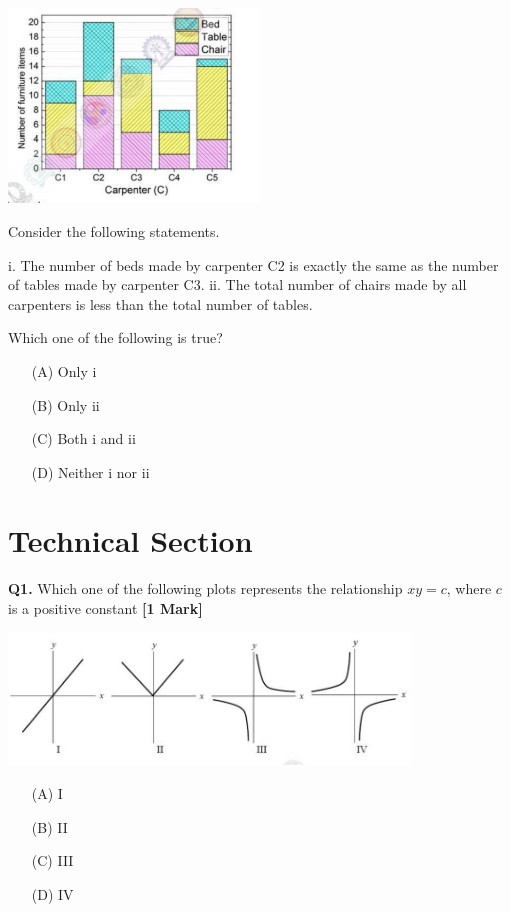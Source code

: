 \documentclass[11pt]{article}
\newcommand{\questiona}[2]{
    \noindent\textbf{Q#2.} #1 \hfill \textbf{[1 Mark]}
}
\begin{document}
\begin{center}
\includegraphics[width=0.5\textwidth]{figures/10.png}
\end{center}

Consider the following statements.

i. The number of beds made by carpenter C2 is exactly the same as the number of tables made by carpenter C3.
ii. The total number of chairs made by all carpenters is less than the total number of tables.

Which one of the following is true?
\begin{enumerate}
    \item[(A)] Only i  
    \item[(B)] Only ii  
    \item[(C)] Both i and ii  
    \item[(D)] Neither i nor ii  
\end{enumerate}
\vspace{0.5cm}

\section*{Technical Section}

\questiona{Which one of the following plots represents the relationship \( xy = c \), where \( c \) is a positive constant}{1}
\begin{center}
\includegraphics[width=0.8\textwidth]{figures/1.png}
\end{center}
\begin{enumerate}
    \item[(A)] I  
    \item[(B)] II  
    \item[(C)] III  
    \item[(D)] IV  
\end{enumerate}
\vspace{0.5cm}
\end{document}
